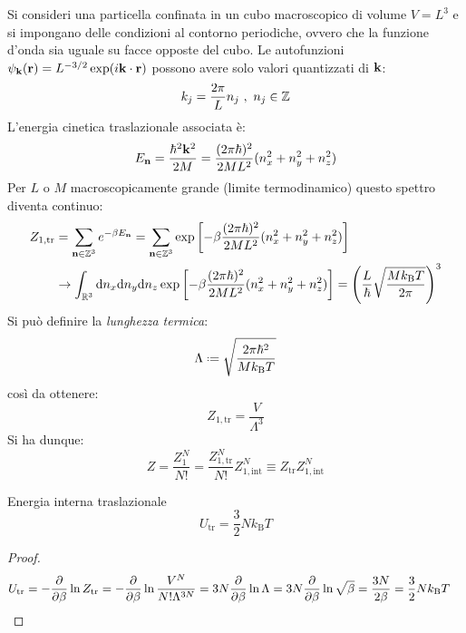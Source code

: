 Si consideri una particella confinata in un cubo macroscopico di volume $ V = L^3 $ e si impongano delle condizioni al contorno periodiche, ovvero che la funzione d'onda sia uguale su facce opposte del cubo. Le autofunzioni $ \psi_{\mathbf{k}}(\mathbf{r}) = L^{-3/2} \exp(i \mathbf{k} \cdot \mathbf{r}) $ possono avere solo valori quantizzati di $ \mathbf{k} $:
\begin{equation*}
	k_j = \frac{2\pi}{L} n_j \,\,,\,\, n_j \in \mathbb{Z}
\end{equation*}
L'energia cinetica traslazionale associata è:
\begin{equation}
	E_{\mathbf{n}} = \frac{\hbar^2 \mathbf{k}^2}{2M} = \frac{(2\pi\hbar)^2}{2M L^2} (n_x^2 + n_y^2 + n_z^2)
\end{equation}
Per $ L $ o $ M $ macroscopicamente grande (limite termodinamico) questo spettro diventa continuo:
\begin{equation*}
	\begin{split}
		Z_{1,\text{tr}}
		& = \sum_{\mathbf{n} \in \mathbb{Z}^3} e^{-\beta E_{\mathbf{n}}} = \sum_{\mathbf{n} \in \mathbb{Z}^3} \exp \left[ - \beta \frac{(2\pi\hbar)^2}{2M L^2} (n_x^2 + n_y^2 + n_z^2) \right] \\
		& \rightarrow \int_{\mathbb{R}^3} \mathrm{d} n_x \mathrm{d} n_y \mathrm{d} n_z \exp \left[ -\beta \frac{(2\pi\hbar)^2}{2M L^2} (n_x^2 + n_y^2 + n_z^2) \right] = \left( \frac{L}{\hbar} \sqrt{\frac{M k_\text{B} T}{2\pi}} \right)^3
	\end{split}
\end{equation*}
Si può definire la \textit{lunghezza termica}:
\begin{equation}
	\Lambda \defeq \sqrt{\frac{2\pi\hbar^2}{M k_\text{B} T}}
\end{equation}
così da ottenere:
\begin{equation}
	Z_{1,\text{tr}} = \frac{V}{\Lambda^3}
\end{equation}
Si ha dunque:
\begin{equation*}
	Z = \frac{Z_1^N}{N!} = \frac{Z_{1,\text{tr}}^N}{N!} Z_{1,\text{int}}^N \equiv Z_\text{tr} Z_{1,\text{int}}^N
\end{equation*}

\begin{proposition}[before upper = {\tcbtitle}]{Energia interna traslazionale}{}
	\begin{equation}
		U_\text{tr} = \frac{3}{2} N k_\text{B} T
	\end{equation}

	\tcblower

	\begin{proof}
		\begin{equation*}
			\begin{split}
				U_\text{tr}
				& = - \frac{\partial}{\partial \beta} \ln Z_\text{tr} = - \frac{\partial}{\partial \beta} \ln \frac{V^N}{N! \Lambda^{3N}} = 3N \frac{\partial}{\partial \beta} \ln \Lambda = 3N \frac{\partial}{\partial \beta} \ln \sqrt{\beta} = \frac{3N}{2\beta} = \frac{3}{2} N k_\text{B} T
			\end{split}
		\end{equation*}
	\end{proof}
\end{proposition}

